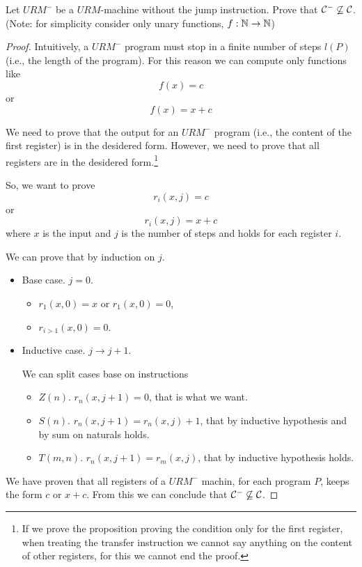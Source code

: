 \documentclass[12pt,a4paper,oneside]{book}
\begin{document}
\begin{exercise}
    Let $URM^-$ be a $URM$-machine without the jump instruction.
    Prove that $\mathcal{C}^- \not\subseteq \mathcal{C}$. (Note: for simplicity consider only unary functions, $f: \mathbb{N} \to \mathbb{N}$)

    \begin{proof}
        Intuitively, a $URM^-$ program must stop in a finite number of steps $l(P)$ (i.e., the length of the program).
        For this reason we can compute only functions like
        \[
        f(x) = c
        \]
        or
        \[
        f(x) = x + c
        \]

        We need to prove that the output for an $URM^-$ program (i.e., the content of the first register) is in the desidered form.
        However, we need to prove that all registers are in the desidered form.\footnote{If we prove the proposition proving the condition only for the first register, when treating the transfer instruction we cannot say anything on the content of other registers, for this we cannot end the proof.}

        So, we want to prove
        \[ r_i(x, j) = c \]
        or
        \[ r_i(x, j) = x + c \]
        where $x$ is the input and $j$ is the number of steps and holds for each register $i$.

        We can prove that by induction on $j$.

        \begin{itemize}
            \item Base case. $j = 0$.
            \begin{itemize}
                \item $r_1(x, 0) = x$ or $r_1(x, 0) = 0$,
                \item $r_{i > 1} (x, 0) = 0$.
            \end{itemize}

            \item Inductive case. $j \to j + 1$.

            We can split cases base on instructions
            \begin{itemize}
                \item $Z(n)$. $r_n(x, j+1) = 0$, that is what we want.
                \item $S(n)$. $r_n(x, j+1) = r_n(x, j) + 1$, that by inductive hypothesis and by sum on naturals holds.
                \item $T(m, n)$. $r_n(x, j + 1) = r_m(x, j)$, that by inductive hypothesis holds.
            \end{itemize}
        \end{itemize}

        We have proven that all registers of a $URM^-$ machin, for each program $P$, keeps the form $c$ or $x + c$. From this we can conclude that $\mathcal{C}^- \not\subseteq \mathcal{C}$.
    \end{proof}

\end{exercise}
\end{document}
